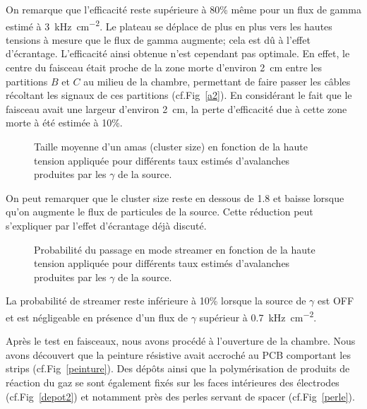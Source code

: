 On remarque que l'efficacité reste supérieure à 80\% même pour un flux de gamma estimé à \SI{3}{\kilo\hertz\per\square\centi\meter}. Le plateau se déplace de plus en plus vers les hautes tensions à mesure que le flux de gamma augmente; cela est dû à l'effet d'écrantage. L'efficacité ainsi obtenue n'est cependant pas optimale. En effet, le centre du faisceau était proche de la zone morte d'environ \SI{2}{\centi\meter} entre les partitions $B$ et $C$ au milieu de la chambre, permettant de faire passer les câbles récoltant les signaux de ces partitions (cf.Fig~\ref{a2}). En considérant le fait que le faisceau avait une largeur d'environ \SI{2}{\centi\meter}, la perte d'efficacité due à cette zone morte à été estimée à 10\%.

\begin{figure}[!ht]
	\centering
	\caption{Taille moyenne d'un amas (cluster size) en fonction de la haute tension appliquée pour différents taux estimés d'avalanches produites par les $\gamma$ de la source.}
	\label{clustersize}
\end{figure}

On peut remarquer que le cluster size reste en dessous de \num{1.8} et baisse lorsque qu'on augmente le flux de particules de la source. Cette réduction peut s'expliquer par l'effet d'écrantage déjà discuté.

\begin{figure}[!ht]
	\centering
	\caption{Probabilité du passage en mode streamer en fonction de la haute tension appliquée pour différents taux estimés d'avalanches produites par les $\gamma$ de la source.}
	\label{probastreamer}
\end{figure}

La probabilité de streamer reste inférieure à 10\% lorsque la source de $\gamma$ est OFF et est négligeable en présence d'un flux de $\gamma$ supérieur à \SI{0.7}{\kilo\hertz\per\square\centi\meter}.

Après le test en faisceaux, nous avons procédé à l'ouverture de la chambre. Nous avons découvert que la peinture résistive avait accroché au PCB comportant les strips (cf.Fig~\ref{peinture}). Des dépôts ainsi que la polymérisation de produits de réaction du gaz se sont également fixés sur les faces intérieures des électrodes (cf.Fig~\ref{depot2}) et notamment près des perles servant de spacer (cf.Fig~\ref{perle}). 

